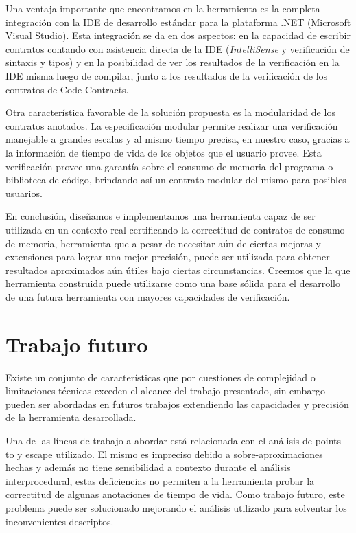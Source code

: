 \documentclass[12pt,a4paper]{article}
\begin{document}
		Una ventaja importante que encontramos en la herramienta es la completa integración con la IDE de desarrollo estándar para la plataforma .NET (Microsoft Visual Studio). Esta integración se da en dos aspectos: en la capacidad de escribir contratos contando con asistencia directa de la IDE (\textit{IntelliSense} y verificación de sintaxis y tipos) y en la posibilidad de ver los resultados de la verificación en la IDE misma luego de compilar, junto a los resultados de la verificación de los contratos de Code Contracts.

		Otra característica favorable de la solución propuesta es la modularidad de los contratos anotados. La especificación modular permite realizar una verificación manejable a grandes escalas y al mismo tiempo precisa, en nuestro caso, gracias a la información de tiempo de vida de los objetos que el usuario provee. Esta verificación provee una garantía sobre el consumo de memoria del programa o biblioteca de código, brindando así un contrato modular del mismo para posibles usuarios.

		En conclusión, diseñamos e implementamos una herramienta capaz de ser utilizada en un contexto real certificando la correctitud de contratos de consumo de memoria, herramienta que a pesar de necesitar aún de ciertas mejoras y extensiones para lograr una mejor precisión, puede ser utilizada para obtener resultados aproximados aún útiles bajo ciertas circunstancias. Creemos que la que herramienta construida puede utilizarse como una base sólida para el desarrollo de una futura herramienta con mayores capacidades de verificación.
	\newpage
	\section{Trabajo futuro} \label{sec:trabfut}
		Existe un conjunto de características que por cuestiones de complejidad o limitaciones técnicas exceden el alcance del trabajo presentado, sin embargo pueden ser abordadas en futuros trabajos extendiendo las capacidades y precisión de la herramienta desarrollada.

		Una de las líneas de trabajo a abordar está relacionada con el análisis de points-to y escape utilizado. El mismo es impreciso debido a sobre-aproximaciones hechas y además no tiene sensibilidad a contexto durante el análisis interprocedural, estas deficiencias no permiten a la herramienta probar la correctitud de algunas anotaciones de tiempo de vida. Como trabajo futuro, este problema puede ser solucionado mejorando el análisis utilizado para solventar los inconvenientes descriptos.
\end{document}
